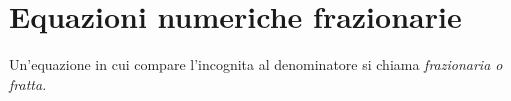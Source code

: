 % 

\section{Equazioni numeriche frazionarie}
\label{sec:eq2gr_frazionarie}

Un'equazione in cui compare l'incognita al denominatore si chiama 
\emph{frazionaria o fratta.}

